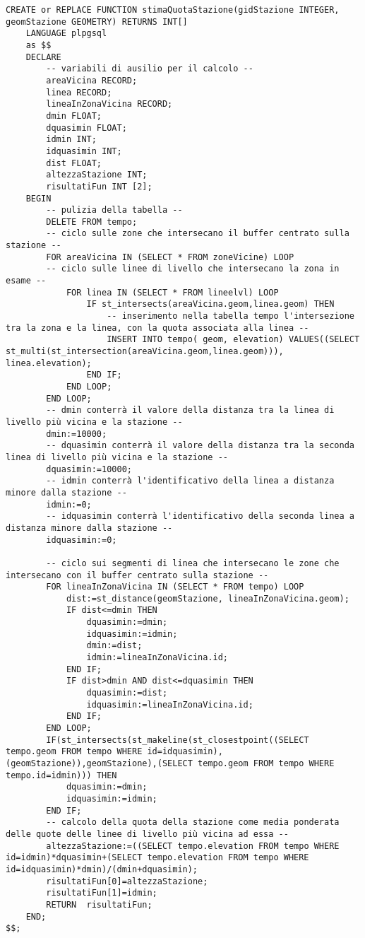 \begin{lstlisting}[style=mySQL]
CREATE or REPLACE FUNCTION stimaQuotaStazione(gidStazione INTEGER, geomStazione GEOMETRY) RETURNS INT[]
	LANGUAGE plpgsql
	as $$
	DECLARE
		-- variabili di ausilio per il calcolo --
		areaVicina RECORD;
		linea RECORD;
		lineaInZonaVicina RECORD;
		dmin FLOAT;
		dquasimin FLOAT;
		idmin INT;
		idquasimin INT;
		dist FLOAT;
		altezzaStazione INT;
		risultatiFun INT [2];
	BEGIN
		-- pulizia della tabella --
		DELETE FROM tempo;
		-- ciclo sulle zone che intersecano il buffer centrato sulla stazione --
		FOR areaVicina IN (SELECT * FROM zoneVicine) LOOP
		-- ciclo sulle linee di livello che intersecano la zona in esame --
			FOR linea IN (SELECT * FROM lineelvl) LOOP
				IF st_intersects(areaVicina.geom,linea.geom) THEN
					-- inserimento nella tabella tempo l'intersezione tra la zona e la linea, con la quota associata alla linea --
					INSERT INTO tempo( geom, elevation) VALUES((SELECT st_multi(st_intersection(areaVicina.geom,linea.geom))), linea.elevation);
				END IF;
			END LOOP;
		END LOOP;
		-- dmin conterrà il valore della distanza tra la linea di livello più vicina e la stazione --
		dmin:=10000;        
		-- dquasimin conterrà il valore della distanza tra la seconda linea di livello più vicina e la stazione --
		dquasimin:=10000;   
		-- idmin conterrà l'identificativo della linea a distanza minore dalla stazione --
		idmin:=0;           
		-- idquasimin conterrà l'identificativo della seconda linea a distanza minore dalla stazione --
		idquasimin:=0;      

		-- ciclo sui segmenti di linea che intersecano le zone che intersecano con il buffer centrato sulla stazione --
		FOR lineaInZonaVicina IN (SELECT * FROM tempo) LOOP
			dist:=st_distance(geomStazione, lineaInZonaVicina.geom);
			IF dist<=dmin THEN
				dquasimin:=dmin;
				idquasimin:=idmin;
				dmin:=dist;
				idmin:=lineaInZonaVicina.id;
			END IF;
			IF dist>dmin AND dist<=dquasimin THEN
				dquasimin:=dist;
				idquasimin:=lineaInZonaVicina.id;
			END IF;
		END LOOP;
		IF(st_intersects(st_makeline(st_closestpoint((SELECT tempo.geom FROM tempo WHERE id=idquasimin),(geomStazione)),geomStazione),(SELECT tempo.geom FROM tempo WHERE tempo.id=idmin))) THEN
			dquasimin:=dmin;
			idquasimin:=idmin;
		END IF;
		-- calcolo della quota della stazione come media ponderata delle quote delle linee di livello più vicina ad essa --
		altezzaStazione:=((SELECT tempo.elevation FROM tempo WHERE id=idmin)*dquasimin+(SELECT tempo.elevation FROM tempo WHERE id=idquasimin)*dmin)/(dmin+dquasimin);
		risultatiFun[0]=altezzaStazione;
		risultatiFun[1]=idmin;
		RETURN  risultatiFun;
	END;
$$;
\end{lstlisting}

